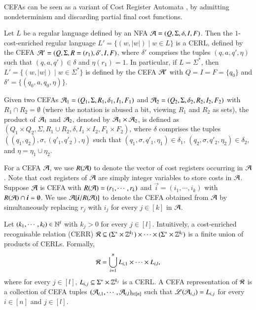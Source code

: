\begin{remark}
CEFAs can be seen as a variant of Cost Register Automata \cite{RLJ+13}, by admitting nondeterminism and discarding partial final cost functions. 
\end{remark}

\begin{example}\label{exm:len}
Let $L$ be a regular language defined by an NFA $\mathcal{A}=(Q, \Sigma, \delta, I, F)$. 
Then the $1$-cost-enriched regular language $L' = \{(w, |w|) \mid w \in L\}$ is a CERL, defined by the CEFA $\mathcal{A}' = (Q, \Sigma, R=(r_1), \delta', I, F)$, where $\delta'$ comprises the tuples $(q, a, q', \eta)$ such that $(q,a,q') \in \delta$ and $\eta(r_1) = 1$.  In particular, if $L=\Sigma^*$, then $L' = \{(w, |w|) \mid w \in \Sigma^*\}$ is defined by the CEFA $\mathcal{A}'$ with $Q =I=F= \{q_0\}$ and $\delta' = \{(q_0, a, q_0, \eta)\}$.
\end{example}

Given two CEFAs $\mathcal{A}_1 = ( Q_1, \Sigma, R_1, \delta_1, I_1, F_1)$ and $\mathcal{A}_2 = (Q_2, \Sigma, \delta_2, R_2, I_2, F_2)$ with $R_1 \cap R_2 = \emptyset$ (where the notation is abused a bit, viewing $R_1$ and $R_2$ as sets),  the product of $\mathcal{A}_1$ and $\mathcal{A}_2$, denoted by $\mathcal{A}_1 \times \mathcal{A}_2$, is defined as $(Q_1 \times Q_2, \Sigma, R_1 \cup R_2, \delta, I_1 \times I_2, F_1 \times F_2)$, where $\delta$ comprises the tuples $((q_1, q_2), \sigma, (q'_1, q'_2), \eta)$ such that $(q_1, \sigma, q'_1, \eta_1) \in \delta_1$, $(q_2, \sigma, q'_2, \eta_2) \in \delta_2$, and $\eta = \eta_1\cup \eta_2$.  %


For a CEFA $\mathcal{A}$, we use $R(\mathcal{A})$ to denote the vector of cost registers occurring in $\mathcal{A}$. Note that cost registers of $\mathcal{A}$ are simply integer variables to store costs in $\mathcal{A}$.
Suppose $\mathcal{A}$ is  CEFA with $R(\mathcal{A})=(r_1,\cdots, r_k)$ and $\vec{i} = (i_1,\cdots, i_k)$ with $R(\NFA) \cap \vec{i} = \emptyset$. We use $\CEFA[\vec{i}/R(\CEFA)]$ to denote the CEFA obtained from $\mathcal{A}$ by simultaneously replacing $r_j$ with $i_j$ for every $j \in [k]$ in $\mathcal{A}$. 

\smallskip

\begin{definition}
Let $(k_1,\cdots, k_l) \in \mathbb{N}^l$ with $k_j > 0$ for every $j \in [l]$. Intuitively, a cost-enriched recognisable relation (CERR)  $\mathcal{R} \subseteq (\Sigma^* \times \mathbb{Z}^{k_1}) \times \cdots  \times (\Sigma^* \times \mathbb{Z}^{k_l})$ is a finite union of products of CERLs. Formally,
	\[\mathcal{R} = \bigcup \limits_{i=1}^n L_{i,1 } \times \cdots \times L_{i, l},\]
	where for every $j \in [l]$, $L_{i,j} \subseteq \Sigma^* \times \mathbb{Z}^{k_j}$ is a CERL. 
	A CEFA representation of $\mathcal{R}$ is a collection of CEFA tuples $(\mathcal{A}_{i,1}, \cdots, \mathcal{A}_{i,l})_{i \in [n]}$ such that $\mathscr{L}(\mathcal{A}_{i,j}) = L_{i,j}$ for every $i \in [n]$ and $j \in [l]$.
\end{definition}


